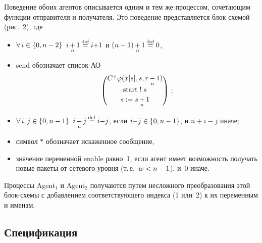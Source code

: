 \begin{multicols}{2}
Поведение обоих агентов описывается
одним и тем же процессом,
сочетающим функции отправителя и получателя.
Это поведение представляется блок-схе\-мой (рис.~2),
где
\begin{itemize}
\item    $\forall\,i\in \{0,n-2\}\;\;i\mathop{+}\limits_{n}1\mathbin{{\mathop{=}\limits^{\mathrm{def}}}}
     i{+}1$ и $(n-1)\mathop{+}\limits_{n}1 \mathbin{{\mathop{=}\limits^{\mathrm{def}}}} 0$,
\item   send обозначает список АО
   $$
   \begin{pmatrix}
   C\,! \,\varphi (x[s], s,
   r\mathop{-}\limits_{n}1)\\[2pt]
   \mathrm{start}\;!\;s\\[2pt]
   s:=s\mathop{+}\limits_{n}1
   \end{pmatrix}\,;
   $$
\item    $\forall\,i,j\hm\in \{0,n-1\}\;\;i\modm{n}j\eam
     i{-}j$, если $i{-}j \hm\in  \{0,n-1\}$, и
$n+i{-}j$ иначе;
\item символ $*$ обозначает искаженное сообщение,
\item значение переменной enable равно~1, если агент
имеет возможность получать новые пакеты от сетевого
уровня (т.\,е.\ $w \hm< n \hm- 1$), и~0 иначе.
\end{itemize}


Процессы Agent$_1$ и Agent$_2$ получаются путем несложного преобразования
этой блок-схе\-мы с добавлением соответствующего
индекса (1 или~2) к их переменным и именам.

\vspace*{-6pt}

\subsection{Спецификация}


\end{multicols}

